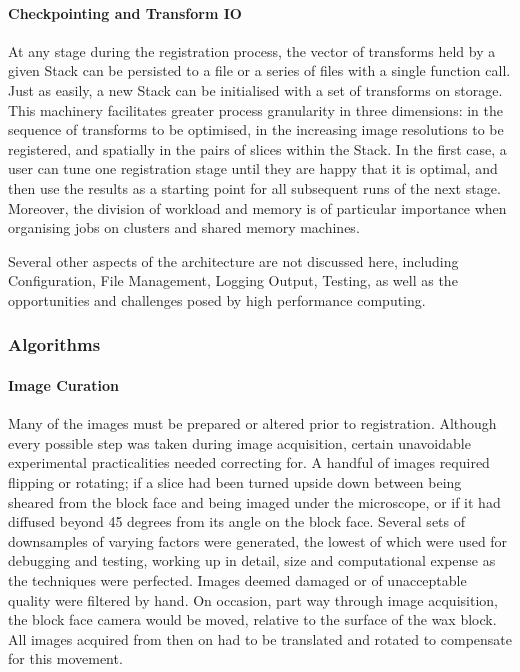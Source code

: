       \paragraph{Checkpointing and Transform IO}
        At any stage during the registration process, the vector of transforms held by a given Stack can be persisted to a file or a series of files with a single function call. Just as easily, a new Stack can be initialised with a set of transforms on storage. This machinery facilitates greater process granularity in three dimensions: in the sequence of transforms to be optimised, in the increasing image resolutions to be registered, and spatially in the pairs of slices within the Stack. In the first case, a user can tune one registration stage until they are happy that it is optimal, and then use the results as a starting point for all subsequent runs of the next stage. Moreover, the division of workload and memory is of particular importance when organising jobs on clusters and shared memory machines.
  
        \vspace{3 mm}

        Several other aspects of the architecture are not discussed here, including Configuration, File Management, Logging Output, Testing, as well as the opportunities and challenges posed by high performance computing.
        
  \subsubsection{Algorithms}
      \paragraph{Image Curation}
        Many of the images must be prepared or altered prior to registration. Although every possible step was taken during image acquisition, certain unavoidable experimental practicalities needed correcting for. A handful of images required flipping or rotating; if a slice had been turned upside down between being sheared from the block face and being imaged under the microscope, or if it had diffused beyond 45 degrees from its angle on the block face. Several sets of downsamples of varying factors were generated, the lowest of which were used for debugging and testing, working up in detail, size and computational expense as the techniques were perfected. Images deemed damaged or of unacceptable quality were filtered by hand. On occasion, part way through image acquisition, the block face camera would be moved, relative to the surface of the wax block. All images acquired from then on had to be translated and rotated to compensate for this movement.

